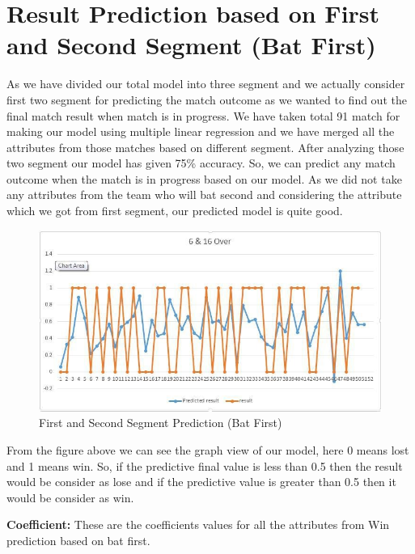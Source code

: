\section{Result Prediction based on First and Second Segment (Bat First)} 
As we have divided our total model into three segment and we actually consider first two segment for predicting the match outcome as we wanted to find out the final match result when match is in progress. We have taken total 91 match for making our model using multiple linear regression and we have merged all the attributes from those matches based on different segment. After analyzing those two segment our model has given 75\% accuracy. So, we can predict any match outcome when the match is in progress based on our model. As we did not take any attributes from the team who will bat second and considering the attribute which we got from first segment, our predicted model is quite good.

\begin{figure}[htbp]
\centering
\includegraphics[scale=0.5]{images/fig-17.jpg}
\caption{First and Second Segment Prediction (Bat First)}
\label{fig:x First and Second Segment Prediction (Bat First)}
\end{figure}

From the figure above we can see the graph view of our model, here 0 means lost and 1 means win. So, if the predictive final value is less than 0.5 then the result would be consider as lose and if the predictive value is greater than 0.5 then it would be consider as win.

\textbf{Coefficient:} These are the coefficients values for all the attributes from Win prediction based on bat first.

